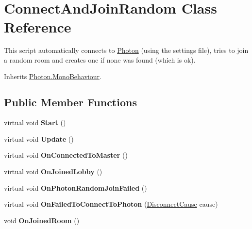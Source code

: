\hypertarget{class_connect_and_join_random}{}\section{Connect\+And\+Join\+Random Class Reference}
\label{class_connect_and_join_random}


This script automatically connects to \hyperlink{namespace_photon}{Photon} (using the settings file), tries to join a random room and creates one if none was found (which is ok).  




Inherits \hyperlink{class_photon_1_1_mono_behaviour}{Photon.\+Mono\+Behaviour}.

\subsection*{Public Member Functions}
\begin{DoxyCompactItemize}
\item 
virtual void {\bfseries Start} ()\hypertarget{class_connect_and_join_random_a94e4c7f48112d0cdd76225301d58be0b}{}\label{class_connect_and_join_random_a94e4c7f48112d0cdd76225301d58be0b}

\item 
virtual void {\bfseries Update} ()\hypertarget{class_connect_and_join_random_ac667e7a1d80a18e1c03e39c74925a18f}{}\label{class_connect_and_join_random_ac667e7a1d80a18e1c03e39c74925a18f}

\item 
virtual void {\bfseries On\+Connected\+To\+Master} ()\hypertarget{class_connect_and_join_random_a2229303d2ad53f9ee29ee9cdd9a9f0be}{}\label{class_connect_and_join_random_a2229303d2ad53f9ee29ee9cdd9a9f0be}

\item 
virtual void {\bfseries On\+Joined\+Lobby} ()\hypertarget{class_connect_and_join_random_a41b158cb3ba3aad65798e8013fc5c56e}{}\label{class_connect_and_join_random_a41b158cb3ba3aad65798e8013fc5c56e}

\item 
virtual void {\bfseries On\+Photon\+Random\+Join\+Failed} ()\hypertarget{class_connect_and_join_random_ab9a5bda7e2e657e4f78bd550010ed851}{}\label{class_connect_and_join_random_ab9a5bda7e2e657e4f78bd550010ed851}

\item 
virtual void {\bfseries On\+Failed\+To\+Connect\+To\+Photon} (\hyperlink{group__public_api_gad61b1461cf60ad9e8d86923d111d5cc9}{Disconnect\+Cause} cause)\hypertarget{class_connect_and_join_random_aadf3359d7ba471cae2073f11b609d615}{}\label{class_connect_and_join_random_aadf3359d7ba471cae2073f11b609d615}

\item 
void {\bfseries On\+Joined\+Room} ()\hypertarget{class_connect_and_join_random_a4774e18af3d44ea1592a965cd0c5cca6}{}\label{class_connect_and_join_random_a4774e18af3d44ea1592a965cd0c5cca6}

\end{DoxyCompactItemize}

